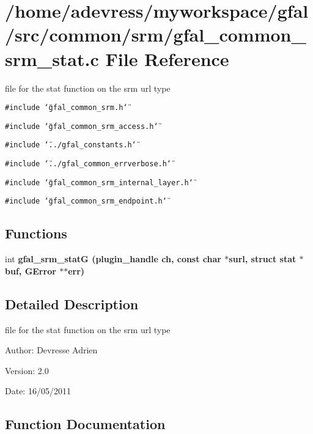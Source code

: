 \section{/home/adevress/myworkspace/gfal/src/common/srm/gfal\_\-common\_\-srm\_\-stat.c File Reference}
\label{gfal__common__srm__stat_8c}
file for the stat function on the srm url type 

{\tt \#include \char`\"{}gfal\_\-common\_\-srm.h\char`\"{}}\par
{\tt \#include \char`\"{}gfal\_\-common\_\-srm\_\-access.h\char`\"{}}\par
{\tt \#include \char`\"{}../gfal\_\-constants.h\char`\"{}}\par
{\tt \#include \char`\"{}../gfal\_\-common\_\-errverbose.h\char`\"{}}\par
{\tt \#include \char`\"{}gfal\_\-common\_\-srm\_\-internal\_\-layer.h\char`\"{}}\par
{\tt \#include \char`\"{}gfal\_\-common\_\-srm\_\-endpoint.h\char`\"{}}\par
\subsection*{Functions}
\begin{CompactItemize}
\item 
int \bf{gfal\_\-srm\_\-stat\-G} (plugin\_\-handle ch, const char $\ast$surl, struct stat $\ast$buf, GError $\ast$$\ast$err)
\end{CompactItemize}


\subsection{Detailed Description}
file for the stat function on the srm url type 

\begin{Desc}
\item[Author:]Devresse Adrien \end{Desc}
\begin{Desc}
\item[Version:]2.0 \end{Desc}
\begin{Desc}
\item[Date:]16/05/2011 \end{Desc}


\subsection{Function Documentation}
